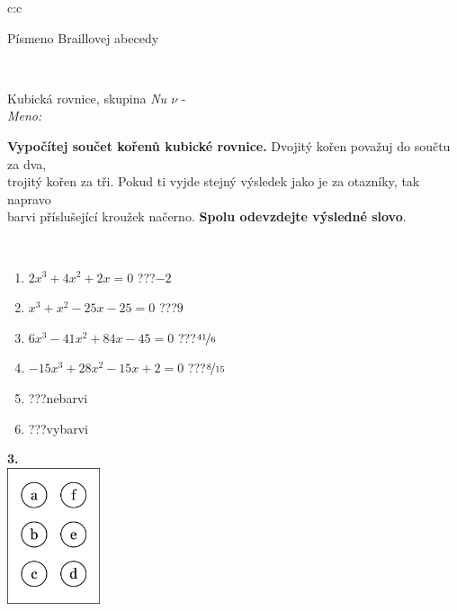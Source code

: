 \documentclass[10pt]{report}
\begin{document}
\begin{tabular}{c:c}
\begin{minipage}[c][104.5mm][t]{0.5\linewidth}
\begin{center}
\begin{minipage}{0.20\linewidth}
\begin{center}
{\small Písmeno Braillovej abecedy}
\end{center}
\end{minipage}
\end{center}
\end{minipage}
\\ \hdashline
\begin{minipage}[c][104.5mm][t]{0.5\linewidth}
\begin{center}
\vspace{7mm}
{\huge Kubická rovnice, skupina \textit{Nu $\nu$} -}\\[5mm]
\textit{Meno:}\phantom{xxxxxxxxxxxxxxxxxxxxxxxxxxxxxxxxxxxxxxxxxxxxxxxxxxxxxxxxxxxxxxxxx}\\[5mm]
\begin{minipage}{0.95\linewidth}
\textbf{Vypočítej součet kořenů kubické rovnice.} Dvojitý kořen považuj do součtu za dva,\\trojitý kořen za tři. Pokud ti vyjde stejný výsledek jako je za otazníky, tak napravo\\barvi příslušející kroužek načerno. \textbf{Spolu odevzdejte výsledné slovo}.
\end{minipage}
\\[1mm]
\begin{minipage}{0.79\linewidth}
\begin{center}
\begin{varwidth}{\linewidth}
\begin{enumerate}
\Large
\item $2x^3+4x^2+2x=0$\quad \dotfill\; ???\;\dotfill \quad $-2$
\item $x^3+x^2-25x-25=0$\quad \dotfill\; ???\;\dotfill \quad $9$
\item $6x^3-41x^2+84x-45=0$\quad \dotfill\; ???\;\dotfill \quad $\nicefrac{41}{6}$
\item $-15x^3+28x^2-15x+2=0$\quad \dotfill\; ???\;\dotfill \quad $\nicefrac{8}{15}$
\item \quad \dotfill\; ???\;\dotfill \quad nebarvi
\item \quad \dotfill\; ???\;\dotfill \quad vybarvi
\end{enumerate}
\end{varwidth}
\end{center}
\end{minipage}
\begin{minipage}{0.20\linewidth}
\begin{center}
{\Huge\bfseries 3.} \\[2mm]
\includegraphics[height=40mm]{../images/braille.png}

\end{center}
\end{minipage}
\end{center}
\end{minipage}
\end{tabular}
\end{document}
